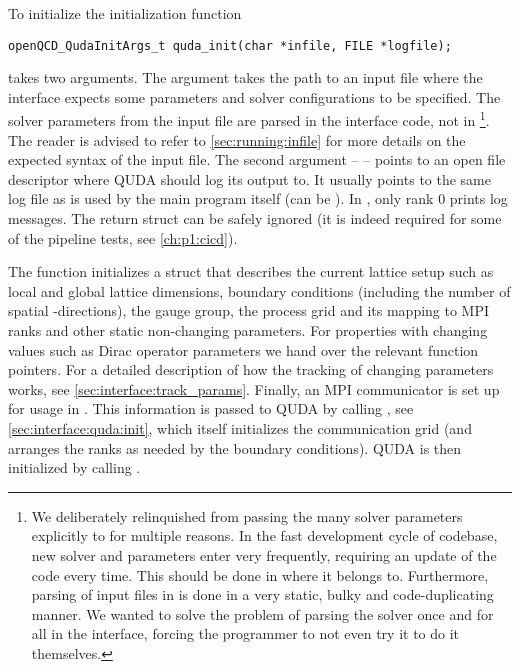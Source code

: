 To initialize \quda the initialization function
\begin{verbatim}
openQCD_QudaInitArgs_t quda_init(char *infile, FILE *logfile);
\end{verbatim}
takes two arguments.
The  argument takes the path to an input file where the interface expects some parameters and solver configurations to be specified.
The solver parameters from the input file are parsed in the interface code, not in \openqxd\footnote{We deliberately relinquished from passing the many solver parameters explicitly to \quda for multiple reasons. In the fast development cycle of \qudas codebase, new solver and parameters enter very frequently, requiring an update of the code every time. This should be done in \quda where it belongs to. Furthermore, parsing of input files in \openqxd is done in a very static, bulky and code-duplicating manner. We wanted to solve the problem of parsing the solver once and for all in the interface, forcing the programmer to not even try it to do it themselves.}.
The reader is advised to refer to \cref{sec:running:infile} for more details on the expected syntax of the input file.
The second argument --  -- points to an open file descriptor where QUDA should log its output to.
It usually points to the same log file as is used by the main program itself (can be ).
In \quda, only rank \num{0} prints log messages.
The return struct can be safely ignored (it is indeed required for some of the pipeline tests, see \cref{ch:p1:cicd}).

The function initializes a struct that describes the current lattice setup such as
  local and global lattice dimensions,
  boundary conditions (including the number of spatial \Cstar-directions),
  the gauge group,
  the process grid and its mapping to MPI ranks
  and other static non-changing parameters.
For properties with changing values such as Dirac operator parameters we hand over the relevant function pointers.
For a detailed description of how the tracking of changing parameters works, see \cref{sec:interface:track_params}.
Finally, an MPI communicator is set up for usage in \quda.
This information is passed to QUDA by calling , see \cref{sec:interface:quda:init}, which itself initializes the communication grid (and arranges the ranks as needed by the boundary conditions). QUDA is then initialized by calling .

